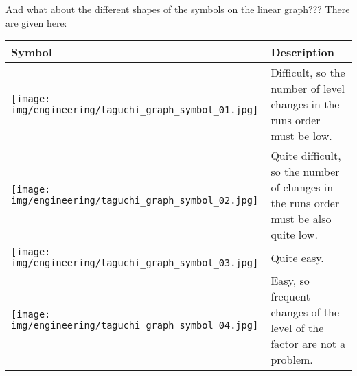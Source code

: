 	And what about the different shapes of the symbols on the linear graph??? There are given here:
	\begin{table}[H]
		\centering
		\begin{tabular}{| m{2cm}| m{8cm}|}
		\hline
		\rowcolor[HTML]{9B9B9B} 
		\textbf{Symbol} & \textbf{Description}                                                                \\ \hline
		 \texttt{[image: img/engineering/taguchi\_graph\_symbol\_01.jpg]} & Difficult, so the number of level changes in the runs order must be low.            \\ \hline
		 \texttt{[image: img/engineering/taguchi\_graph\_symbol\_02.jpg]} & Quite difficult, so the number of changes in the runs order must be also quite low. \\ \hline
		 \texttt{[image: img/engineering/taguchi\_graph\_symbol\_03.jpg]} & Quite easy.                                                                         \\ \hline
		\texttt{[image: img/engineering/taguchi\_graph\_symbol\_04.jpg]} & Easy, so frequent changes of the level of the factor are not a problem.             \\ \hline
		\end{tabular}
	\end{table}
	

